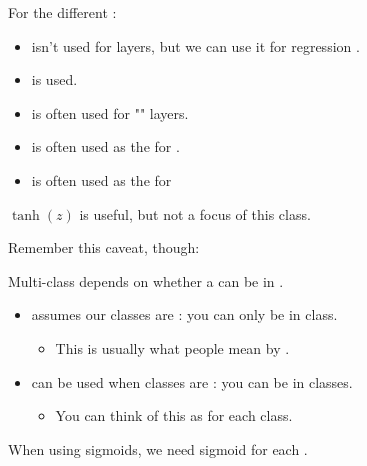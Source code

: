         \begin{concept}
            For the different :
            
            \begin{itemize}
                \item {} isn't used for  layers, but we can use it for regression .
                
                \item {} is  used.
                
                \item {} is often used for "" layers.
                
                \item {} is often used as the  for .
                
                \item {} is often used as the  for  
            \end{itemize}
            $\tanh(z)$ is useful, but not a focus of this class.
        \end{concept}

        Remember this caveat, though:\\

        \begin{clarification}
            Multi-class depends on whether a  can be in .

            \begin{itemize}
                \item {} assumes our classes are : you can only be in  class.
                    \begin{itemize}
                        \item This is usually what people mean by .
                    \end{itemize}

                \item {} can be used when classes are : you can be in  classes.
                    \begin{itemize}
                        \item You can think of this as  for each class.
                    \end{itemize}
            \end{itemize}
            
            When using sigmoids, we need  sigmoid for each .
        \end{clarification}

